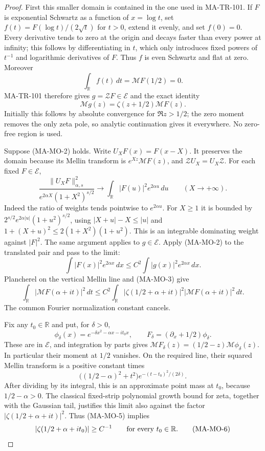 \begin{proof}
First this smaller domain is contained in the one used in
MA-TR-101. If $F$ is exponential Schwartz as a function of
$x=\log t$, set $f(t)=F(\log t)/(2\sqrt t)$ for $t>0$,
extend it evenly, and set $f(0)=0$. Every derivative tends
to zero at the origin and decays faster than every power at
infinity; this follows by differentiating in $t$, which only
introduces fixed powers of $t^{-1}$ and logarithmic derivatives
of $F$. Thus $f$ is even Schwartz and flat at zero. Moreover
\[
       \int_{\mathbb R}f(t)\,dt=\mathcal MF(1/2)=0.
\]
MA-TR-101 therefore gives $g=\mathcal ZF\in\mathcal E$ and
the exact identity
\[
 \mathcal Mg(z)=\zeta(z+1/2)\mathcal MF(z).
 \tag{MA-MO-3}
\]
Initially this follows by absolute convergence for $\Re z>1/2$;
the zero moment removes the only zeta pole, so analytic
continuation gives it everywhere. No zero-free region is used.

Suppose (MA-MO-2) holds. Write $U_XF(x)=F(x-X)$. It preserves
the domain because its Mellin transform is
$e^{Xz}\mathcal MF(z)$, and $\mathcal ZU_X=U_X\mathcal Z$.
For each fixed $F\in\mathcal E$,
\[
 \frac{\|U_XF\|_{\alpha,s}^2}
      {e^{2\alpha X}(1+X^2)^{s/2}}
 \longrightarrow
       \int_{\mathbb R}|F(u)|^2e^{2\alpha u}\,du
       \qquad(X\to+\infty).
 \tag{MA-MO-4}
\]
Indeed the ratio of weights tends pointwise to $e^{2\alpha u}$.
For $X\ge1$ it is bounded by
$2^{s/2}e^{2\alpha|u|}(1+u^2)^{s/2}$, using
$|X+u|-X\le|u|$ and
$1+(X+u)^2\le2(1+X^2)(1+u^2)$.
This is an integrable dominating weight against $|F|^2$.
The same argument applies to $g\in\mathcal E$.
Apply (MA-MO-2) to the translated pair and pass to the limit:
\[
 \int|F(x)|^2e^{2\alpha x}\,dx
 \le C^2\int|g(x)|^2e^{2\alpha x}\,dx.
\]
Plancherel on the vertical Mellin line and (MA-MO-3) give
\[
 \int_{\mathbb R}|\mathcal MF(\alpha+it)|^2\,dt
 \le C^2\int_{\mathbb R}
     |\zeta(1/2+\alpha+it)|^2
                  |\mathcal MF(\alpha+it)|^2\,dt.
 \tag{MA-MO-5}
\]
The common Fourier normalization constant cancels.

Fix any $t_0\in\mathbb R$ and put, for $\delta>0$,
\[
 \phi_\delta(x)=e^{-\delta x^2-\alpha x-it_0x},
 \qquad F_\delta=(\partial_x+1/2)\phi_\delta.
\]
These are in $\mathcal E$, and integration by parts gives
$\mathcal MF_\delta(z)=(1/2-z)\mathcal M\phi_\delta(z)$.
In particular their moment at $1/2$ vanishes. On the required
line, their squared Mellin transform is a positive constant
times
\[
 \bigl((1/2-\alpha)^2+t^2\bigr)
                     e^{-(t-t_0)^2/(2\delta)}.
\]
After dividing by its integral, this is an approximate point
mass at $t_0$, because $1/2-\alpha>0$.
The classical fixed-strip polynomial growth bound for zeta,
together with the Gaussian tail, justifies this limit also
against the factor $|\zeta(1/2+\alpha+it)|^2$.
Thus (MA-MO-5) implies
\[
          |\zeta(1/2+\alpha+it_0)|\ge C^{-1}
                     \qquad\hbox{for every }t_0\in\mathbb R.
 \tag{MA-MO-6}
\]


\end{proof}
